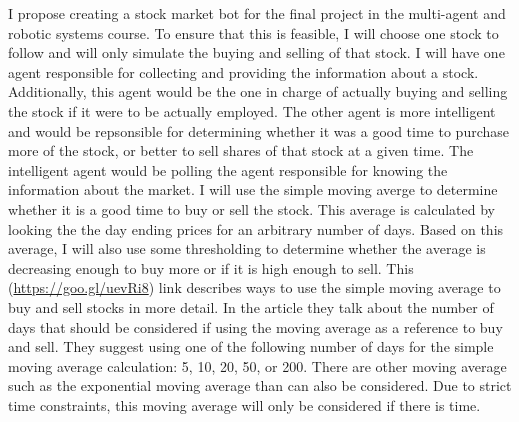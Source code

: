 



\MYTITLE{}
\MYHEADERS{}
\PLEDGE{}

I propose creating a stock market bot for the final project in the multi-agent and robotic systems
course. To ensure that this is feasible, I will choose one stock to follow and will only simulate the
buying and selling of that stock. I will have one agent responsible for collecting and providing the
information about a stock. Additionally, this agent would be the one in charge of actually buying
and selling the stock if it were to be actually employed.
The other agent is more intelligent and would be repsonsible for determining whether it was a good
time to purchase more of the stock, or better to sell shares of that stock at a given time. The intelligent
agent would be polling the agent responsible for knowing the information about the market.
I will use the simple moving averge to determine whether it is a good time to buy or sell the stock.
This average is calculated by looking the the day ending prices for an arbitrary number of days.
Based on this average, I will also use some thresholding to determine whether the average is decreasing
enough to buy more or if it is high enough to sell. This (\url{https://goo.gl/uevRi8}) link describes ways
to use the simple moving average to buy and sell stocks in more detail. In the article they talk about
the number of days that should be considered if using the moving average as a reference to buy and sell.
They suggest using one of the following number of days for the simple moving average calculation: 5, 10, 20,
50, or 200. There are other moving average such as the exponential moving average than can also be
considered. Due to strict time constraints, this moving average will only be considered if there is time.


